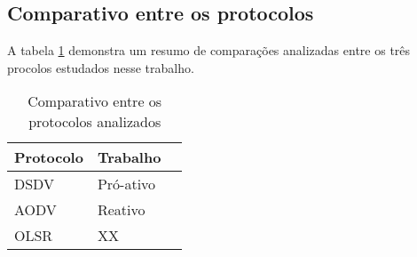 \subsection{Comparativo entre os protocolos} 
A tabela \ref{tabCompProt} demonstra um resumo de compara\c{c}\~oes analizadas entre os tr\^es procolos estudados nesse trabalho.

\begin{table}[H]
	\centering
	\caption{Comparativo entre os protocolos analizados}
	\begin{tabular}{ | l | l | l | }
		\hline
		Protocolo & Trabalho \\ \hline
		DSDV & Pr\'o-ativo \\ \hline
		AODV & Reativo \\ \hline
		OLSR & XX \\ \hline
	\end{tabular}
	\label{tabCompProt}
\end{table}